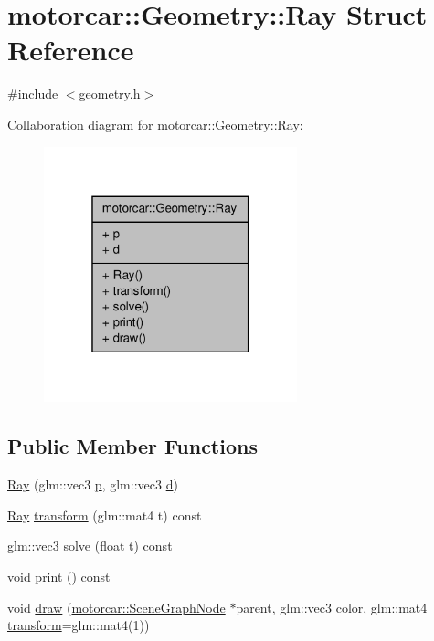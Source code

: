 \hypertarget{structmotorcar_1_1Geometry_1_1Ray}{\section{motorcar\-:\-:Geometry\-:\-:Ray Struct Reference}
\label{structmotorcar_1_1Geometry_1_1Ray}
}


{\ttfamily \#include $<$geometry.\-h$>$}



Collaboration diagram for motorcar\-:\-:Geometry\-:\-:Ray\-:
\nopagebreak
\begin{figure}[H]
\begin{center}
\leavevmode
\includegraphics[width=208pt]{structmotorcar_1_1Geometry_1_1Ray__coll__graph}
\end{center}
\end{figure}
\subsection*{Public Member Functions}
\begin{DoxyCompactItemize}
\item 
\hyperlink{structmotorcar_1_1Geometry_1_1Ray_a0e703633f6101262ee14d17831745ca4}{Ray} (glm\-::vec3 \hyperlink{structmotorcar_1_1Geometry_1_1Ray_ac58960f9f82f19c6f514ae6c948deb86}{p}, glm\-::vec3 \hyperlink{structmotorcar_1_1Geometry_1_1Ray_a7140db28237277781ecb792fc280a95d}{d})
\item 
\hyperlink{structmotorcar_1_1Geometry_1_1Ray}{Ray} \hyperlink{structmotorcar_1_1Geometry_1_1Ray_a7de7ddd9609a26bdd1f2fe74933dfff6}{transform} (glm\-::mat4 t) const 
\item 
glm\-::vec3 \hyperlink{structmotorcar_1_1Geometry_1_1Ray_af14d102bfe9fdf08bb3396ad33d928bd}{solve} (float t) const 
\item 
void \hyperlink{structmotorcar_1_1Geometry_1_1Ray_a058da6e22e8fdcd7e2aa301153c9fa16}{print} () const 
\item 
void \hyperlink{structmotorcar_1_1Geometry_1_1Ray_a7d9403aa28c33c40d4b7e3c64ce3776d}{draw} (\hyperlink{classmotorcar_1_1SceneGraphNode}{motorcar\-::\-Scene\-Graph\-Node} $\ast$parent, glm\-::vec3 color, glm\-::mat4 \hyperlink{structmotorcar_1_1Geometry_1_1Ray_a7de7ddd9609a26bdd1f2fe74933dfff6}{transform}=glm\-::mat4(1))
\end{DoxyCompactItemize}
